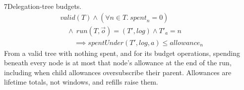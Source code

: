 \begin{perchstatement}{7}{Delegation-tree budgets.}\label{stmt:delegation-tree-budgets}
\[\begin{aligned}&\mathit{valid}(T) \land (\forall n \in T.\ \mathit{spent}_n = 0)\\
&\quad \land\ \mathit{run}(T, \vec o) = (T', \mathit{log}) \land T'_a = n\\
&\qquad \implies \mathit{spentUnder}(T', \mathit{log}, a) \le \mathit{allowance}_n\end{aligned}\]
From a valid tree with nothing spent, and for its budget operations, spending beneath every node is at most that node's allowance at the end of the run, including when child allowances oversubscribe their parent. Allowances are lifetime totals, not windows, and refills raise them.
\end{perchstatement}
